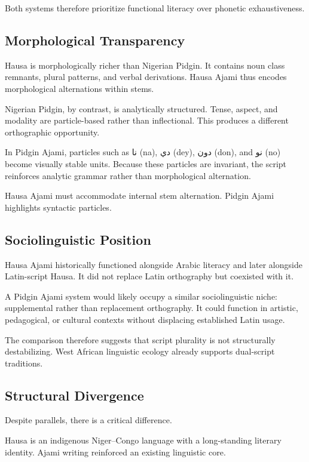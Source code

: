 \documentclass[12pt]{article}
\newcommand{\AR}[1]{\foreignlanguage{arabic}{#1}}
\begin{document}
Both systems therefore prioritize functional literacy over phonetic exhaustiveness.

\subsection{Morphological Transparency}

Hausa is morphologically richer than Nigerian Pidgin. It contains noun class remnants, plural patterns, and verbal derivations. Hausa Ajami thus encodes morphological alternations within stems.

Nigerian Pidgin, by contrast, is analytically structured. Tense, aspect, and modality are particle-based rather than inflectional. This produces a different orthographic opportunity.

In Pidgin Ajami, particles such as \AR{نا} (na), \AR{دي} (dey), \AR{دون} (don), and \AR{نو} (no) become visually stable units. Because these particles are invariant, the script reinforces analytic grammar rather than morphological alternation.

Hausa Ajami must accommodate internal stem alternation. Pidgin Ajami highlights syntactic particles.

\subsection{Sociolinguistic Position}

Hausa Ajami historically functioned alongside Arabic literacy and later alongside Latin-script Hausa. It did not replace Latin orthography but coexisted with it.

A Pidgin Ajami system would likely occupy a similar sociolinguistic niche: supplemental rather than replacement orthography. It could function in artistic, pedagogical, or cultural contexts without displacing established Latin usage.

The comparison therefore suggests that script plurality is not structurally destabilizing. West African linguistic ecology already supports dual-script traditions.

\subsection{Structural Divergence}

Despite parallels, there is a critical difference.

Hausa is an indigenous Niger–Congo language with a long-standing literary identity. Ajami writing reinforced an existing linguistic core.
\end{document}
